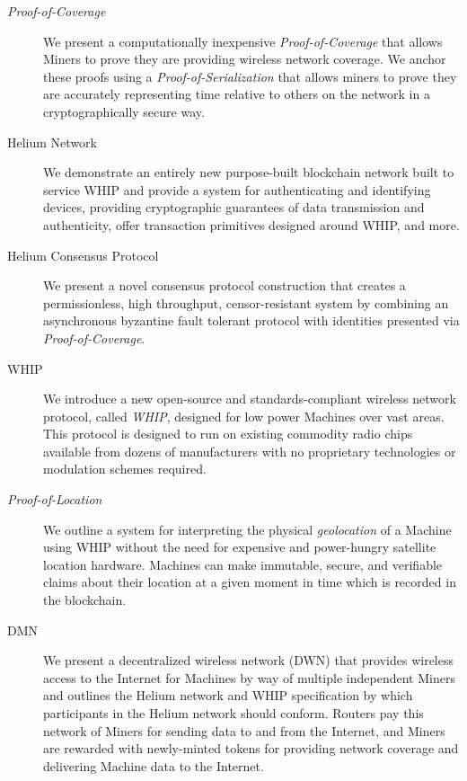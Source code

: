 \documentclass[10pt, nonatbib, nocopyrightspace, reprint]{sigplanconf}
\begin{document}
\begin{description}
  \item [\emph{Proof-of-Coverage}] We present a computationally inexpensive \emph{Proof-of-Coverage} that allows Miners to prove they are providing wireless network coverage. We anchor these proofs using a \emph{Proof-of-Serialization} that allows miners to prove they are accurately representing time relative to others on the network in a cryptographically secure way.

  \item [Helium Network] We demonstrate an entirely new purpose-built block\-chain network built to service WHIP and provide a system for authenticating and identifying devices, providing cryptographic guarantees of data transmission and authenticity, offer transaction primitives designed around WHIP, and more.

  \item [Helium Consensus Protocol] We present a novel consensus protocol construction that creates a permissionless, high throughput, censor-resistant system by combining an asynchronous byzantine fault tolerant protocol with identities presented via \emph{Proof-of-Coverage}.

  \item [WHIP] We introduce a new open-source and standards-compliant wireless network protocol, called \emph{WHIP}, designed for low power Machines over vast areas. This protocol is designed to run on existing commodity radio chips available from dozens of manufacturers with no proprietary technologies or modulation schemes required.

  \item [\emph{Proof-of-Location}] We outline a system for interpreting the physical \emph{geolocation} of a Machine using WHIP without the need for expensive and power-hungry satellite location hardware. Machines can make immutable, secure, and verifiable claims about their location at a given moment in time which is recorded in the blockchain.

  \item [DMN] We present a decentralized wireless network (DWN) that provides wireless access to the Internet for Machines by way of multiple independent Miners and outlines the Helium network and WHIP specification by which participants in the Helium network should conform. Routers pay this network of Miners for sending data to and from the Internet, and Miners are rewarded with newly-minted tokens for providing network coverage and delivering Machine data to the Internet.
\end{description}
\end{document}
